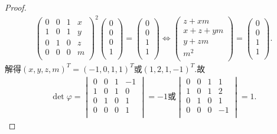\documentclass[../../main.tex]{subfiles}%
\begin{document}
\begin{proof}
\begin{align*}
\begin{pmatrix}
0&		0&		1&		x\\
1&		0&		1&		y\\
0&		1&		0&		z\\
0&		0&		0&		m\\
\end{pmatrix}^2 \left( \begin{array}{c}
0\\
0\\
0\\
1\\
\end{array} \right) =\left( \begin{array}{c}
0\\
0\\
1\\
1\\
\end{array} \right) \Longleftrightarrow \left( \begin{array}{c}
z+xm\\
x+z+ym\\
y+zm\\
m^2\\
\end{array} \right) =\left( \begin{array}{c}
0\\
0\\
1\\
1\\
\end{array} \right) .
\end{align*}
解得$(x,y,z,m)^T=(-1,0,1,1)^T$或$(1,2,1,-1)^T$.故
\begin{align*}
\det \varphi=\begin{vmatrix}
0&		0&		1&		-1\\
1&		0&		1&		0\\
0&		1&		0&		1\\
0&		0&		0&		1\\
\end{vmatrix}=-1\text{或}\begin{vmatrix}
0&		0&		1&		1\\
1&		0&		1&		2\\
0&		1&		0&		1\\
0&		0&		0&		-1\\
\end{vmatrix}=1.
\end{align*}

\end{proof}
\end{document}
